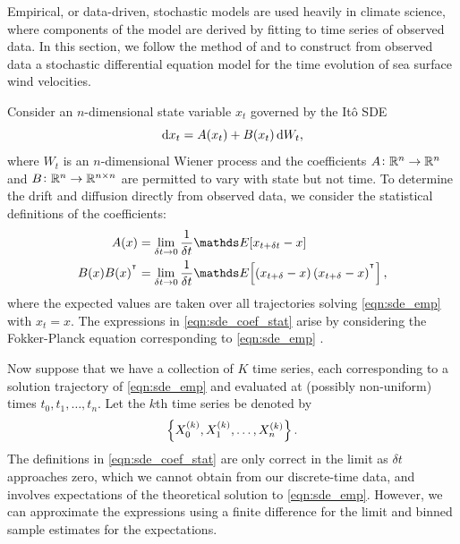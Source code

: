 Empirical, or data-driven, stochastic models are used heavily in climate science, where components of the model are derived by fitting to time series of observed data.
In this section, we follow the method of \citet{EggerJonsson_2002_DynamicModelsIcelandic} and \citet{Sura_2003_StochasticAnalysisSouthern} to construct from observed data a stochastic differential equation model for the time evolution of sea surface wind velocities.

Consider an \(n\)-dimensional state variable \(x_t\) governed by the It\^o SDE
\begin{equation}\label{eqn:sde_emp}
	\dif x_t = A(x_t) + B(x_t)\dif W_t,
\end{equation}
where \(W_t\) is an \(n\)-dimensional Wiener process and the coefficients \(A \colon \mathbb{R}^n \to \mathbb{R}^n\) and \(B \colon \mathbb{R}^n \to \mathbb{R}^{n\times n}\) are permitted to vary with state but not time.
To determine the drift and diffusion directly from observed data, we consider the statistical definitions of the coefficients:
\begin{subequations}\label{eqn:sde_coef_stat}
	\begin{align}
		A(x)          & = \lim_{\delta t \to 0}\frac{1}{\delta t}\avg{x_{t + \delta t} - x} \label{eqn:sde_coef_stat_drift}                                                \\
		B(x)B(x)^{\T} & = \lim_{\delta t \to 0}\frac{1}{\delta t}\avg{\left(x_{t + \delta} - x\right)\left(x_{t + \delta} - x\right)^{\T}}, \label{eqn:sde_coef_stat_diff}
	\end{align}
\end{subequations}
where the expected values are taken over all trajectories solving \cref{eqn:sde_emp} with \(x_{t} = x\).
The expressions in \cref{eqn:sde_coef_stat} arise by considering the Fokker-Planck equation corresponding to \eqref{eqn:sde_emp} \citehere.

Now suppose that we have a collection of \(K\) time series, each corresponding to a solution trajectory of \cref{eqn:sde_emp} and evaluated at (possibly non-uniform) times \(t_0, t_1, \dotsc, t_n\).
Let the \(k\)th time series be denoted by
\[
	\set{X_{0}^{(k)}, X_{1}^{(k)}, \dotsc, X_{n}^{(k)}}.
\]
The definitions in \cref{eqn:sde_coef_stat} are only correct in the limit as \(\delta t\) approaches zero, which we cannot obtain from our discrete-time data, and involves expectations of the theoretical solution to \eqref{eqn:sde_emp}.
However, we can approximate the expressions using a finite difference for the limit and binned sample estimates for the expectations.




